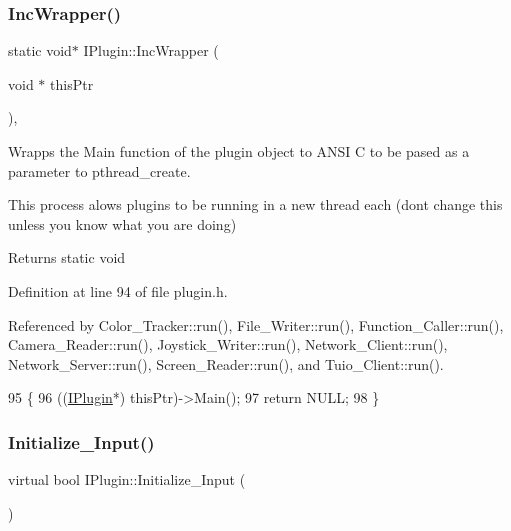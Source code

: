 \subsubsection{\texorpdfstring{Inc\+Wrapper()}{IncWrapper()}}
{\footnotesize\ttfamily static void$\ast$ I\+Plugin\+::\+Inc\+Wrapper (\begin{DoxyParamCaption}\item[{void $\ast$}]{this\+Ptr }\end{DoxyParamCaption})\hspace{0.3cm}{\ttfamily [inline]}, {\ttfamily [static]}}



Wrapps the Main function of the plugin object to A\+N\+SI C to be pased as a parameter to pthread\+\_\+create. 

This process alows plugins to be running in a new thread each (don\textquotesingle{}t change this unless you know what you are doing)

\begin{DoxyReturn}{Returns}
static void 
\end{DoxyReturn}


Definition at line 94 of file plugin.\+h.



Referenced by Color\+\_\+\+Tracker\+::run(), File\+\_\+\+Writer\+::run(), Function\+\_\+\+Caller\+::run(), Camera\+\_\+\+Reader\+::run(), Joystick\+\_\+\+Writer\+::run(), Network\+\_\+\+Client\+::run(), Network\+\_\+\+Server\+::run(), Screen\+\_\+\+Reader\+::run(), and Tuio\+\_\+\+Client\+::run().


\begin{DoxyCode}
95     \{
96       ((\hyperlink{class_i_plugin}{IPlugin}*) thisPtr)->Main();
97       \textcolor{keywordflow}{return} NULL;
98     \}
\end{DoxyCode}
\mbox{\label{class_i_plugin_aa7c66743ad956d8ada57becee559af4d}} 
\subsubsection{\texorpdfstring{Initialize\+\_\+\+Input()}{Initialize\_Input()}}
{\footnotesize\ttfamily virtual bool I\+Plugin\+::\+Initialize\+\_\+\+Input (\begin{DoxyParamCaption}{ }\end{DoxyParamCaption})\hspace{0.3cm}{\ttfamily [pure virtual]}}



